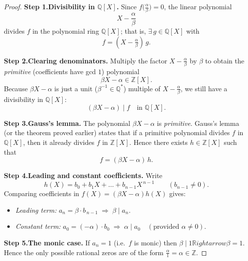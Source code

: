 \documentclass[12pt]{article}
\theoremstyle{definition} %
\theoremstyle{plain} %
\begin{document}
    \begin{proof}
    \textbf{Step 1.\;Divisibility in \(\mathbb{Q}[X]\).}
    Since \(f\!\bigl(\tfrac{\alpha}{\beta}\bigr)=0\), the linear polynomial
    \[
       X-\frac{\alpha}{\beta}
    \]
    divides \(f\) in the polynomial ring \(\mathbb{Q}[X]\); that is,
    \(\exists\,g\in\mathbb{Q}[X]\) with
    \[
       f=(X-\tfrac{\alpha}{\beta})\,g.
    \]
    
    \smallskip
    \textbf{Step 2.\;Clearing denominators.}
    Multiply the factor \(X-\tfrac{\alpha}{\beta}\) by \(\beta\) to obtain
    the \emph{primitive} (coefficients have gcd \(1\)) polynomial
    \[
       \beta X-\alpha\in\mathbb{Z}[X].
    \]
    Because \(\beta X-\alpha\) is just a unit
    (\(\beta^{-1}\in\mathbb{Q}^{\!*}\)) multiple of
    \(X-\tfrac{\alpha}{\beta}\), we still have a divisibility in
    \(\mathbb{Q}[X]\):
    \[
       (\beta X-\alpha)\mid f \quad\text{in }\mathbb{Q}[X].
    \]
    
    \smallskip
    \textbf{Step 3.\;Gauss’s lemma.}
    The polynomial \(\beta X-\alpha\) is \emph{primitive}.
    Gauss’s lemma (or the theorem proved earlier) states that if a primitive
    polynomial divides \(f\) in \(\mathbb{Q}[X]\), then it already divides
    \(f\) in \(\mathbb{Z}[X]\).
    Hence there exists \(h\in\mathbb{Z}[X]\) such that
    \[
       f=(\beta X-\alpha)\,h.
    \]
    
    \smallskip
    \textbf{Step 4.\;Leading and constant coefficients.}
    Write
    \[
       h(X)=b_{0}+b_{1}X+\dots+b_{n-1}X^{\,n-1}\qquad(b_{n-1}\neq 0).
    \]
    Comparing coefficients in
    \(f(X)=(\beta X-\alpha)h(X)\) gives:
    
    \begin{itemize}
       \item \emph{Leading term: }
             \(\displaystyle
             a_{n}= \beta\cdot b_{\,n-1}\;\Longrightarrow\;
             \beta\mid a_{n}.
             \)
       \item \emph{Constant term: }
             \(\displaystyle
             a_{0}=(-\alpha)\cdot b_{0}
             \;\Longrightarrow\;
             \alpha\mid a_{0}\quad(\text{provided }\alpha\neq 0).
             \)
    \end{itemize}
    
    \smallskip
    \textbf{Step 5.\;The monic case.}
    If \(a_{n}=1\) (i.e.\ \(f\) is monic) then
    \(\beta\mid 1\mathbb{R}ightarrow\beta=1\).
    Hence the only possible rational zeros are of the form
    \(\tfrac{\alpha}{1}=\alpha\in\mathbb{Z}\).
    
    \end{proof}
\end{document}
